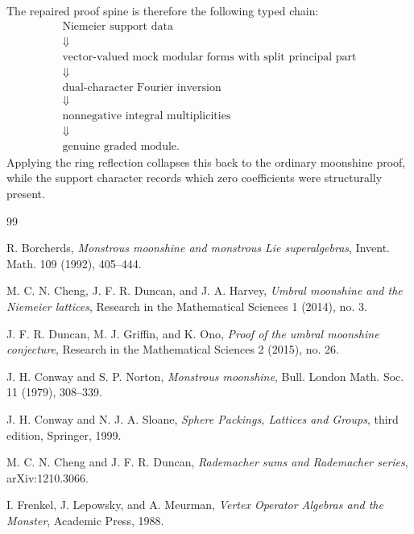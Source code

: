 \documentclass[11pt]{article}
\begin{document}
The repaired proof spine is therefore the following typed chain:
\[
\begin{array}{c}
\boxed{\text{Niemeier support data}}\\[0.35em]
\Downarrow\\[0.35em]
\boxed{\text{vector-valued mock modular forms with split principal part}}\\[0.35em]
\Downarrow\\[0.35em]
\boxed{\text{dual-character Fourier inversion}}\\[0.35em]
\Downarrow\\[0.35em]
\boxed{\text{nonnegative integral multiplicities}}\\[0.35em]
\Downarrow\\[0.35em]
\boxed{\text{genuine graded module}}.
\end{array}
\]
Applying the ring reflection collapses this back to the ordinary moonshine proof, while the support character records which zero coefficients were structurally present.

\begin{thebibliography}{99}

R. Borcherds,
\emph{Monstrous moonshine and monstrous Lie superalgebras},
Invent. Math. 109 (1992), 405--444.

M. C. N. Cheng, J. F. R. Duncan, and J. A. Harvey,
\emph{Umbral moonshine and the Niemeier lattices},
Research in the Mathematical Sciences 1 (2014), no. 3.

J. F. R. Duncan, M. J. Griffin, and K. Ono,
\emph{Proof of the umbral moonshine conjecture},
Research in the Mathematical Sciences 2 (2015), no. 26.

J. H. Conway and S. P. Norton,
\emph{Monstrous moonshine},
Bull. London Math. Soc. 11 (1979), 308--339.

J. H. Conway and N. J. A. Sloane,
\emph{Sphere Packings, Lattices and Groups},
third edition, Springer, 1999.

M. C. N. Cheng and J. F. R. Duncan,
\emph{Rademacher sums and Rademacher series},
arXiv:1210.3066.

I. Frenkel, J. Lepowsky, and A. Meurman,
\emph{Vertex Operator Algebras and the Monster},
Academic Press, 1988.

\end{thebibliography}
\end{document}
